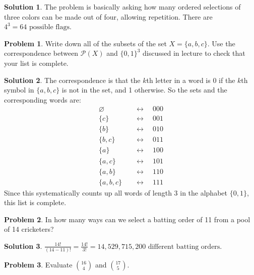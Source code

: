 \documentclass{article}
\numberwithin{equation}{section}
\theoremstyle{plain}
\theoremstyle{definition}
\newtheorem{problem}{Problem}
\newtheorem*{solution*}{Solution}
\newcommand{\Ps}{\mathcal P}
\let\emptyset\varnothing
\begin{document}
\begin{solution*}
	The problem is basically asking how many ordered selections of three colors can be made out of four, allowing repetition. There are $\boxed{4^3 = 64 \textrm{ possible flags.}}$
\end{solution*}

\begin{problem}
	Write down all of the subsets of the set $X = \{a,b,c\}$. Use the correspondence between $\Ps(X)$ and $\{0,1\}^3$ discussed in lecture to check that your list is complete. 
\end{problem}

\begin{solution*}
	The correspondence is that the $k$th letter in a word is 0 if the $k$th symbol in $\{a,b,c\}$ is not in the set, and 1 otherwise. So the sets and the corresponding words are: 
	\[
	\boxed{\begin{aligned}
		\emptyset \quad &\longleftrightarrow \quad 000 \\
		\{c\} \quad &\longleftrightarrow \quad 001 \\
		\{b\} \quad &\longleftrightarrow \quad 010 \\
		\{b,c\} \quad &\longleftrightarrow \quad 011 \\
		\{a\} \quad &\longleftrightarrow \quad 100 \\
		\{a,c\} \quad &\longleftrightarrow \quad 101 \\
		\{a,b\} \quad &\longleftrightarrow \quad 110 \\
		\{a,b,c\} \quad &\longleftrightarrow \quad 111
		\end{aligned}}
	\]
	Since this systematically counts up all words of length 3 in the alphabet $\{0,1\}$, this list is complete. 
\end{solution*}

\begin{problem}
	In how many ways can we select a batting order of 11 from a pool of 14 cricketers? 
\end{problem}

\begin{solution*}
	$\displaystyle \frac{14!}{(14-11)!} = \boxed{\frac{14!}{3!} = 14,529,715,200 \textrm{ different batting orders.}}$
\end{solution*}

\begin{problem}
	Evaluate $\binom{16}4$ and $\binom{17}5$. 
\end{problem}
\end{document}
